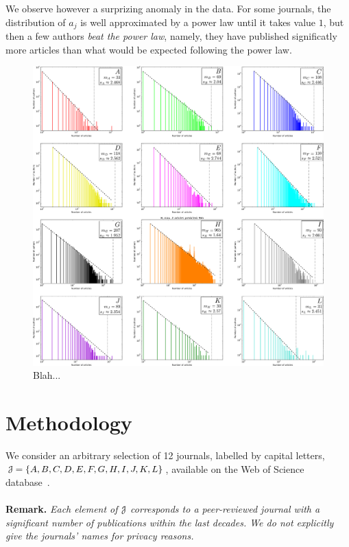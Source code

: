 \documentclass[9pt,twocolumn,twoside]{pnas-new}
\begin{document}
We observe however a surprizing anomaly in the data. 
For some journals, the distribution of $a_j$ is well approximated by a power law until it takes value $1$, but then a few authors \emph{beat the power law}, 
namely, they have published significatly more articles than what would be expected following the power law.

\begin{figure}
 \centering
 \includegraphics[width=\textwidth]{../figures/ABCDEFGHIJKL.pdf}
 \caption{Blah...}
 \label{fig:1}
\end{figure}

\section{Methodology}
We consider an arbitrary selection of 12 journals, labelled by capital letters, ${\cal J}=\{A,B,C,D,E,F,G,H,I,J,K,L\}$, available on the Web of Science database~\cite{WoS}. 

\paragraph{}
{\bf Remark.}\textit{
Each element of ${\cal J}$ corresponds to a peer-reviewed journal with a significant number of publications within the last decades. 
We do not explicitly give the journals' names for privacy reasons.
}
\end{document}

